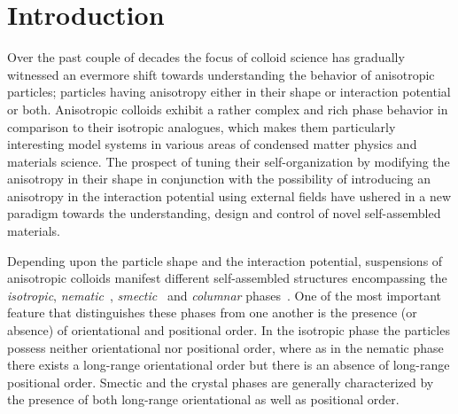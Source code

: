 \documentclass[aps,prl,preprint,superscriptaddress]{revtex4-1} %
\begin{document}
\section{Introduction}
Over the past couple of decades the focus of colloid science has gradually witnessed an evermore shift towards understanding the behavior of anisotropic particles; particles having anisotropy either in their shape or interaction potential or both. Anisotropic colloids exhibit a rather complex and rich phase behavior in comparison to their isotropic analogues, which makes them particularly interesting model systems in various areas of condensed matter physics and materials science. The prospect of tuning their self-organization by modifying the anisotropy in their shape in conjunction with the possibility of introducing an anisotropy in the interaction potential using external fields have ushered in a new paradigm towards the understanding, design and control of novel self-assembled materials. \par
Depending upon the particle shape and the interaction potential, suspensions of aniso\-tropic colloids manifest different
self-assembled structures encompassing the \emph{isotropic}, 
\emph{nematic}~\cite{pizzey2004suspensions, van1998formation, purdy2005nematic, buining1993isotropic, fraden1989isotropic, lemaire2002outstanding, lemaire2004physical, vroege2014biaxial, van2010uniaxial, rossi2010cholesteric, li2016colloidal,dogic2016filamentous}, 
\emph{smectic}~\cite{davidson2018isotropic, vroege2006smectic, kuijk2012phase} and \emph{columnar} phases~\cite{van2000liquid, brown1999phase, wijnhoven2005sedimentation, van2004liquid, van2005evidence}. 
One of the most important feature that distinguishes these phases from one another is the presence (or absence) of orientational and positional order. In the isotropic phase the particles possess neither 
orientational nor positional order, where as in the nematic phase there exists a long-range orientational order but there is an absence of long-range positional order. 
Smectic and the crystal phases are generally characterized by the presence of both long-range orientational as well as positional order. \par
\end{document}
